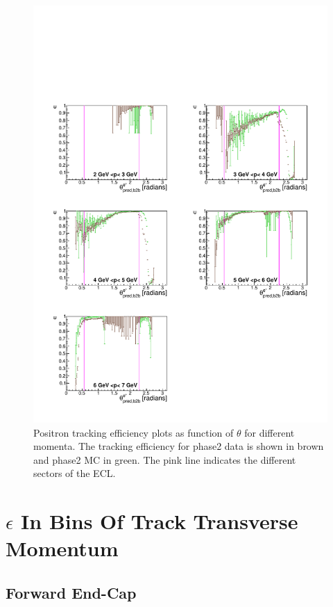 \documentclass[a4paper,11pt,twosided,final,german,openbib,pdftex,listof=totoc,bibliography=totoc]{scrbook}
\begin{document}
\begin{figure}[!htbp]
	\centering
	\includegraphics[width=\textwidth]{Plots/master/xPMThetaep}
	\caption[Momentum $\theta$ Positron Efficiency Phase2]{Positron tracking efficiency plots as function of  $\theta$ for different momenta. The tracking efficiency for phase2 data is shown in brown and phase2 MC in green. The pink line indicates the different sectors of the ECL.}
	\label{plt:xPMThetaep}
\end{figure}

\clearpage

\section{$\epsilon$ In Bins Of Track Transverse Momentum}

\subsection{Forward End-Cap}
\end{document}
